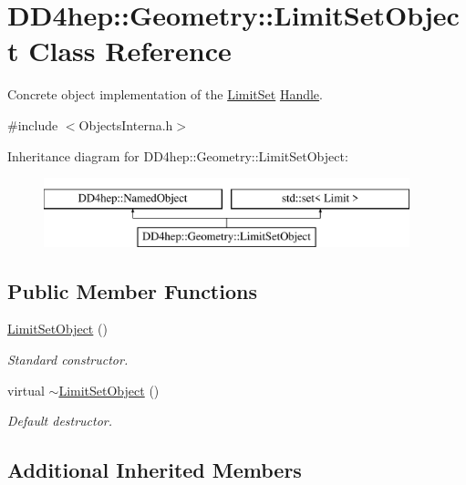 \hypertarget{class_d_d4hep_1_1_geometry_1_1_limit_set_object}{}\section{D\+D4hep\+:\+:Geometry\+:\+:Limit\+Set\+Object Class Reference}
\label{class_d_d4hep_1_1_geometry_1_1_limit_set_object}


Concrete object implementation of the \hyperlink{class_d_d4hep_1_1_geometry_1_1_limit_set}{Limit\+Set} \hyperlink{class_d_d4hep_1_1_handle}{Handle}.  




{\ttfamily \#include $<$Objects\+Interna.\+h$>$}

Inheritance diagram for D\+D4hep\+:\+:Geometry\+:\+:Limit\+Set\+Object\+:\begin{figure}[H]
\begin{center}
\leavevmode
\includegraphics[height=2.000000cm]{class_d_d4hep_1_1_geometry_1_1_limit_set_object}
\end{center}
\end{figure}
\subsection*{Public Member Functions}
\begin{DoxyCompactItemize}
\item 
\hyperlink{class_d_d4hep_1_1_geometry_1_1_limit_set_object_a82ba3444d35470dba78073a03c00a368}{Limit\+Set\+Object} ()
\begin{DoxyCompactList}\small\item\em Standard constructor. \end{DoxyCompactList}\item 
virtual \hyperlink{class_d_d4hep_1_1_geometry_1_1_limit_set_object_aa437df9d9fb981ac515d47efb876df1a}{$\sim$\+Limit\+Set\+Object} ()
\begin{DoxyCompactList}\small\item\em Default destructor. \end{DoxyCompactList}\end{DoxyCompactItemize}
\subsection*{Additional Inherited Members}


